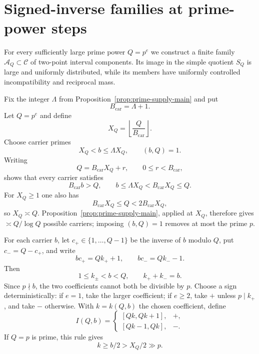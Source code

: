 \section{Signed-inverse families at prime-power steps}
\label{sec:signed-inverse}

For every sufficiently large prime power $Q=p^e$ we construct a finite family $\mathcal A_Q\subset\mathcal C$ of two-point interval components.  Its image in the simple quotient $S_Q$ is large and uniformly distributed, while its members have uniformly controlled incompatibility and reciprocal mass.

Fix the integer $\Lambda$ from Proposition~\ref{prop:prime-supply-main} and put
\[
B_{\mathrm{car}}=\Lambda+1.
\]
Let $Q=p^e$ and define
\begin{equation}\label{eq:carrier-base}
X_Q=\left\lfloor\frac{Q}{B_{\mathrm{car}}}\right\rfloor.
\end{equation}
Choose carrier primes
\begin{equation}\label{eq:carrier-band}
X_Q<b\le\Lambda X_Q,
\qquad (b,Q)=1.
\end{equation}
Writing
\[
Q=B_{\mathrm{car}}X_Q+r,
\qquad 0\le r<B_{\mathrm{car}},
\]
shows that every carrier satisfies
\begin{equation}\label{eq:carrier-exact}
B_{\mathrm{car}}b>Q,
\qquad
b\le\Lambda X_Q<B_{\mathrm{car}}X_Q\le Q.
\end{equation}
For $X_Q\ge1$ one also has
\[
B_{\mathrm{car}}X_Q\le Q<2B_{\mathrm{car}}X_Q,
\]
so $X_Q\asymp Q$.  Proposition~\ref{prop:prime-supply-main}, applied at $X_Q$, therefore gives $\asymp Q/\log Q$ possible carriers; imposing $(b,Q)=1$ removes at most the prime $p$.

For each carrier $b$, let $c_+\in\{1,\ldots,Q-1\}$ be the inverse of $b$ modulo $Q$, put $c_-=Q-c_+$, and write
\begin{equation}\label{eq:signed-inverse}
bc_+=Qk_++1,
\qquad
bc_-=Qk_--1.
\end{equation}
Then
\[
1\le k_\pm<b<Q,
\qquad
k_++k_-=b.
\]
Since $p\nmid b$, the two coefficients cannot both be divisible by $p$.  Choose a sign deterministically: if $e=1$, take the larger coefficient; if $e\ge2$, take $+$ unless $p\mid k_+$, and take $-$ otherwise.  With $k=k(Q,b)$ the chosen coefficient, define
\begin{equation}\label{eq:signed-block}
I(Q,b)=
\begin{cases}
[Qk,Qk+1],&+,\\
[Qk-1,Qk],&-.
\end{cases}
\end{equation}
If $Q=p$ is prime, this rule gives
\begin{equation}\label{eq:atomic-k-lower}
k\ge b/2>X_Q/2\gg p.
\end{equation}

